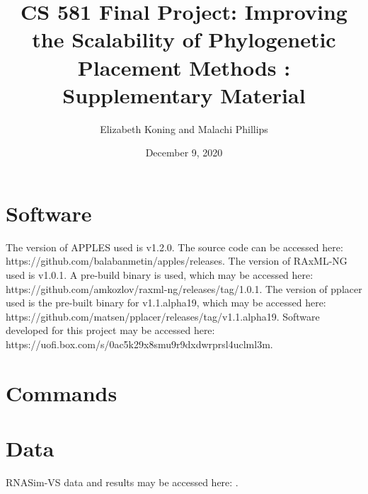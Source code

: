 \documentclass[10pt]{article}
\title{CS 581 Final Project: Improving the Scalability of Phylogenetic Placement Methods : Supplementary Material}
\author{Elizabeth Koning and Malachi Phillips}
\date{December 9, 2020}
\begin{document}
\maketitle

\section{Software}
The version of APPLES used is v1.2.0. The source code can be accessed here:\newline
https://github.com/balabanmetin/apples/releases.\newline
The version of RAxML-NG used is v1.0.1. A pre-build binary is used, which may be accessed here:\newline
https://github.com/amkozlov/raxml-ng/releases/tag/1.0.1.\newline
The version of pplacer used is the pre-built binary for v1.1.alpha19, which may be accessed here:\newline
https://github.com/matsen/pplacer/releases/tag/v1.1.alpha19.
Software developed for this project may be accessed here:\newline
https://uofi.box.com/s/0ac5k29x8smu9r9dxdwrprsl4uclml3m.

\section{Commands}
\section{Data}

RNASim-VS data and results may be accessed here: .
\end{document}

